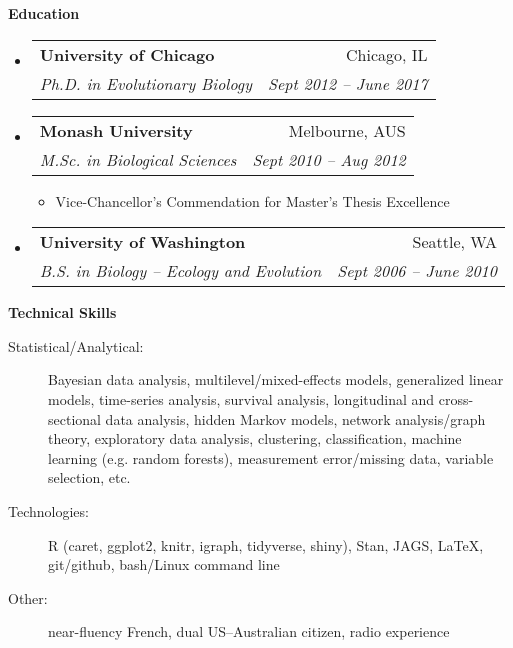 \documentclass[letterpaper,11pt]{article}
\makeatletter
\newcommand{\resheading}[1]{{\large \colorbox{mygrey}{\begin{minipage}{\textwidth}{\textbf{#1 \vphantom{p\^{E}}}}\end{minipage}}}}
\newcommand{\ressubheading}[4]{
  \begin{tabular*}{6.5in}{l@{\extracolsep{\fill}}r}
    \textbf{#1} & #2 \\
    \textit{#3} & \textit{#4} \\
\end{tabular*}\vspace{-6pt}}
\makeatother
\begin{document}
\resheading{Education}
\begin{itemize}
  \item
    \ressubheading{University of Chicago}{Chicago, IL}{Ph.D. in Evolutionary Biology}{Sept 2012 -- June 2017}
  \item
    \ressubheading{Monash University}{Melbourne, AUS}{M.Sc. in Biological Sciences}{Sept 2010 -- Aug 2012}
    \begin{itemize}
      \item Vice-Chancellor's Commendation for Master's Thesis Excellence
    \end{itemize}
  \item
    \ressubheading{University of Washington}{Seattle, WA}{B.S. in Biology -- Ecology and Evolution}{Sept 2006 -- June 2010}
\end{itemize} %



%

\vspace{0.25in}
\resheading{Technical Skills}
\begin{description}
  \item[Statistical/Analytical:] { \footnotesize Bayesian data analysis, multilevel/mixed-effects models, generalized linear models, time-series analysis, survival analysis, longitudinal and cross-sectional data analysis, hidden Markov models, network analysis/graph theory, exploratory data analysis, clustering, classification, machine learning (e.g. random forests), measurement error/missing data, variable selection, etc. }
  \item[Technologies:] { \footnotesize R (caret, ggplot2, knitr, igraph, tidyverse, shiny), Stan, JAGS, \LaTeX, git/github, bash/Linux command line }
  \item[Other:] { \footnotesize near-fluency French, dual US--Australian citizen, radio experience }
\end{description} %
\vspace{0.25in}

\end{document}
